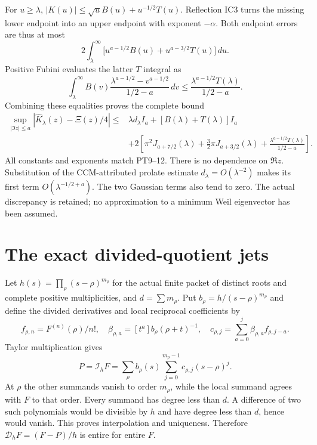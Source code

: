 \documentclass[11pt]{article}
\begin{document}
For $u\ge\lambda$, $|K(u)|\le\sqrt u B(u)+u^{-1/2}T(u)$.
Reflection IC3 turns the missing lower endpoint into an upper
endpoint with exponent $-\alpha$. Both endpoint errors are thus
at most
\[
 2\int_\lambda^\infty
     \big[u^{a-1/2}B(u)+u^{a-3/2}T(u)\big]\,du.
\]
Positive Fubini evaluates the latter $T$ integral as
\[
 \int_\lambda^\infty B(v)
       \frac{\lambda^{a-1/2}-v^{a-1/2}}{1/2-a}\,dv
 \le\frac{\lambda^{a-1/2}T(\lambda)}{1/2-a}.
\]
Combining these equalities proves the complete bound
\begin{equation}\tag{IC9}
 \begin{split}
 \sup_{|\Im z|\le a}|\widehat K_\lambda(z)-\Xi(z)/4|
 \le{}&\lambda d_\lambda I_a+[B(\lambda)+T(\lambda)]I_a\\
 &+2\left[\pi^2J_{a+7/2}(\lambda)
 +\tfrac32\pi J_{a+3/2}(\lambda)
 +\frac{\lambda^{a-1/2}T(\lambda)}{1/2-a}\right].
 \end{split}
\end{equation}
All constants and exponents match PT9--12. There is no dependence
on $\Re z$. Substitution of the CCM-attributed prolate estimate
$d_\lambda=O(\lambda^{-2})$ makes its first term
$O(\lambda^{-1/2+a})$. The two Gaussian terms also tend to zero.
The actual discrepancy is retained; no approximation to a minimum
Weil eigenvector has been assumed.

\section{The exact divided-quotient jets}
Let $h(s)=\prod_\rho(s-\rho)^{m_\rho}$ for the actual finite
packet of distinct roots and complete positive multiplicities,
and $d=\sum m_\rho$. Put $b_\rho=h/(s-\rho)^{m_\rho}$ and define
the divided derivatives and local reciprocal coefficients by
\[
 f_{\rho,n}=F^{(n)}(\rho)/n!,\quad
 \beta_{\rho,a}=[t^a]b_\rho(\rho+t)^{-1},\quad
 c_{\rho,j}=\sum_{a=0}^j\beta_{\rho,a}f_{\rho,j-a}.
\]
Taylor multiplication gives
\begin{equation}\tag{IC10}
 P=\mathcal I_hF=\sum_\rho b_\rho(s)
                   \sum_{j=0}^{m_\rho-1}c_{\rho,j}(s-\rho)^j.
\end{equation}
At $\rho$ the other summands vanish to order $m_\rho$, while
the local summand agrees with $F$ to that order. Every summand
has degree less than $d$. A difference of two such polynomials
would be divisible by $h$ and have degree less than $d$, hence
would vanish. This proves interpolation and uniqueness.
Therefore $\mathcal D_hF=(F-P)/h$ is entire for entire $F$.
\end{document}
